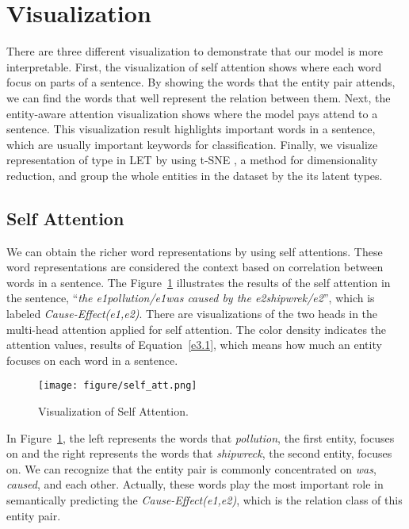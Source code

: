 \documentclass[twoside,leqno,twocolumn]{article}
\begin{document}
\section{Visualization}
There are three different visualization to demonstrate that our model is more interpretable.
First, the visualization of self attention shows where each word focus on parts of a sentence.
By showing the words that the entity pair attends, we can find the words that well represent the relation between them.
Next, the entity-aware attention visualization shows where the model pays attend to a sentence.
This visualization result highlights important words in a sentence, which are usually important keywords for classification.
Finally, we visualize representation of type in LET by using t-SNE \cite{maaten2008visualizing}, a method for dimensionality reduction, and group the whole entities in the dataset by the its latent types.



\subsection{Self Attention}
We can obtain the richer word representations by using self attentions.
These word representations are considered the context based on correlation between words in a sentence.
The Figure~\ref{fig:self_att} illustrates the results of the self attention in the sentence, ``\textit{the \textlangle e1\textrangle pollution\textlangle /e1\textrangle was caused by the \textlangle e2\textrangle shipwrek\textlangle /e2\textrangle}'', which is labeled \textit{Cause-Effect(e1,e2)}.
There are visualizations of the two heads in the multi-head attention applied for self attention.
The color density indicates the attention values, results of Equation~\ref{e3.1}, which means how much an entity focuses on each word in a sentence.
\begin{figure}[!ht]
\texttt{[image: figure/self\_att.png]}
\caption{Visualization of Self Attention.}
\label{fig:self_att}
\end{figure}

In Figure~\ref{fig:self_att}, the left represents the words that \textit{pollution}, the first entity, focuses on and the right represents the words that \textit{shipwreck}, the second entity, focuses on.
We can recognize that the entity pair is commonly concentrated on \textit{was}, \textit{caused}, and each other.
Actually, these words play the most important role in semantically predicting the \textit{Cause-Effect(e1,e2)}, which is the relation class of this entity pair.
\end{document}
